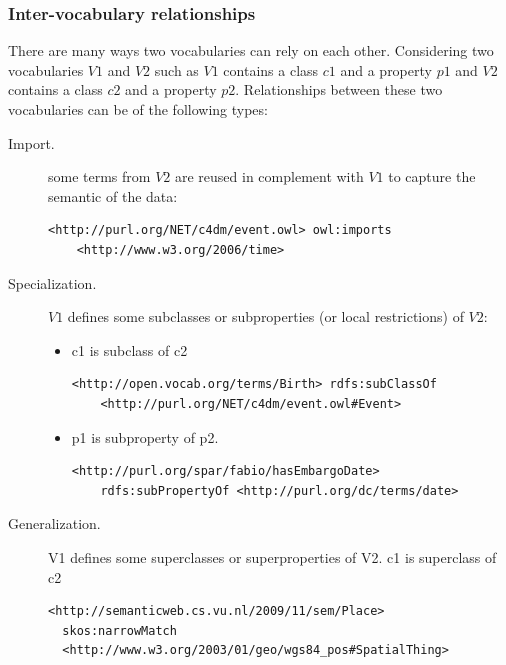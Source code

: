 \documentclass{iosart2c}
\begin{document}
\subsubsection{Inter-vocabulary relationships} \label{voafRelations}
		There are many ways two vocabularies can rely on each other. Considering two vocabularies $V1$ and $V2$ such as $V1$ contains a class $c1$ and a property $p1$ and $V2$ contains a class $c2$ and a property $p2$. Relationships between these two vocabularies can be of the following types:
		\begin{description}
			\item [Import.] some terms from $V2$ are reused in complement with $V1$ to capture the semantic of the data:
\begin{lstlisting}[basicstyle=\tiny,float=htb,label=list:person, language=turtle]
<http://purl.org/NET/c4dm/event.owl> owl:imports 
	<http://www.w3.org/2006/time>
\end{lstlisting}
			\item [Specialization.] $V1$ defines some subclasses or subproperties (or local restrictions) of $V2$:
				\begin{itemize}
					\item c1 is subclass of c2 
\begin{lstlisting}[basicstyle=\tiny,float=htb,label=list:person, language=turtle]
<http://open.vocab.org/terms/Birth> rdfs:subClassOf 
	<http://purl.org/NET/c4dm/event.owl#Event>
\end{lstlisting}
					\item p1 is subproperty of p2.  
\begin{lstlisting}[basicstyle=\tiny,float=htb,label=list:person, language=turtle]
<http://purl.org/spar/fabio/hasEmbargoDate> 
	rdfs:subPropertyOf <http://purl.org/dc/terms/date>
\end{lstlisting}
				\end{itemize}

			\item [Generalization.] V1 defines some superclasses or superproperties of V2. c1 is superclass of c2 
\begin{lstlisting}[basicstyle=\tiny,float=htb,label=list:person, language=turtle]
<http://semanticweb.cs.vu.nl/2009/11/sem/Place> 
  skos:narrowMatch 
  <http://www.w3.org/2003/01/geo/wgs84_pos#SpatialThing>
\end{lstlisting}


\end{description}
\end{document}
